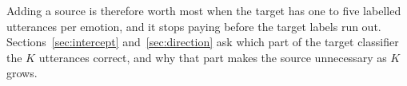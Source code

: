 Adding a source is therefore worth most when the target has one to five labelled utterances per emotion, and it stops paying before the target labels run out. Sections~\ref{sec:intercept} and~\ref{sec:direction} ask which part of the target classifier the $K$ utterances correct, and why that part makes the source unnecessary as $K$ grows.
